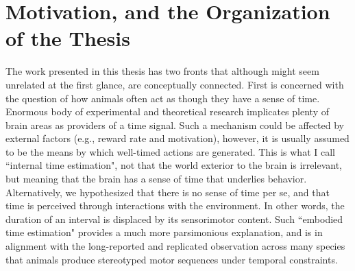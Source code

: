\section[Motivation and Organization]{Motivation, and the Organization of the Thesis}
\label{intro:question}

The work presented in this thesis has two fronts that although might seem unrelated at the first glance, are conceptually connected.
First is concerned with the question of how animals often act as though they have a sense of time.
Enormous body of experimental and theoretical research implicates plenty of brain areas as providers of a time signal.
Such a mechanism could be affected by external factors (e.g., reward rate and motivation), however, it is usually assumed to be the means by which well-timed actions are generated.
This is what I call ``internal time estimation", not that the world exterior to the brain is irrelevant, but meaning that the brain has a sense of time that underlies behavior.
Alternatively, we hypothesized that there is no sense of time per se, and that time is perceived through interactions with the environment.
In other words, the duration of an interval is displaced by its sensorimotor content.
Such ``embodied time estimation" provides a much more parsimonious explanation, and is in alignment with the long-reported and replicated observation across many species that animals produce stereotyped motor sequences under temporal constraints.
